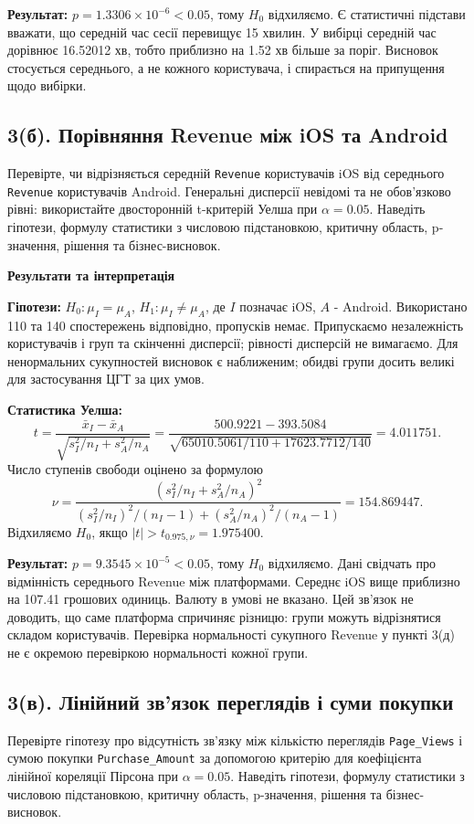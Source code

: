 \documentclass[11pt,a4paper]{article}
\newcommand{\pythoncode}[1]{%
  \Needspace{6\baselineskip}
  \begin{tcolorbox}[enhanced,breakable,colback=black!2!white,colframe=black!15!white,
    colbacktitle=black!6!white,coltitle=accent,fonttitle=\bfseries\small,
    title=Код Python,title after break={Код Python (продовження)},boxrule=0.4pt,arc=1mm,left=2mm,right=2mm,top=2mm,bottom=2mm,
    before skip=6pt,after skip=8pt]
  
  \end{tcolorbox}}
\newcommand{\answerheading}{\Needspace{4\baselineskip}\par\medskip
  {\color{answergreen}\bfseries Результати та інтерпретація}\par\smallskip}
\begin{document}
\textbf{Результат:} \(p=1.3306\times 10^{-6}<0.05\), тому \(H_0\) відхиляємо. Є статистичні підстави вважати, що середній час сесії перевищує 15 хвилин. У вибірці середній час дорівнює 16.52012 хв, тобто приблизно на 1.52 хв більше за поріг. Висновок стосується середнього, а не кожного користувача, і спирається на припущення щодо вибірки.
\subsection*{3(б). Порівняння Revenue між iOS та Android}
\begin{taskstatement}
Перевірте, чи відрізняється середній \texttt{Revenue} користувачів iOS від середнього \texttt{Revenue} користувачів Android.
Генеральні дисперсії невідомі та не обов’язково рівні: використайте двосторонній t-критерій Уелша при $\alpha=0.05$.
Наведіть гіпотези, формулу статистики з числовою підстановкою, критичну область, p-значення, рішення та бізнес-висновок.
\end{taskstatement}


\pythoncode{part3-cell7}
\answerheading
\textbf{Гіпотези:} \(H_0:\mu_I=\mu_A\), \(H_1:\mu_I\ne\mu_A\), де \(I\) позначає iOS, \(A\) - Android. Використано 110 та 140 спостережень відповідно, пропусків немає. Припускаємо незалежність користувачів і груп та скінченні дисперсії; рівності дисперсій не вимагаємо. Для ненормальних сукупностей висновок є наближеним; обидві групи досить великі для застосування ЦГТ за цих умов.

\textbf{Статистика Уелша:} \[t=\frac{\bar x_I-\bar x_A}{\sqrt{s_I^2/n_I+s_A^2/n_A}}
=\frac{500.9221-393.5084}{\sqrt{65010.5061/110+17623.7712/140}}=4.011751.\] Число ступенів свободи оцінено за формулою \[\nu=\frac{(s_I^2/n_I+s_A^2/n_A)^2}{(s_I^2/n_I)^2/(n_I-1)+(s_A^2/n_A)^2/(n_A-1)}=154.869447.\] Відхиляємо \(H_0\), якщо \(|t|>t_{0.975,\nu}=1.975400\).

\textbf{Результат:} \(p=9.3545\times 10^{-5}<0.05\), тому \(H_0\) відхиляємо. Дані свідчать про відмінність середнього Revenue між платформами. Середнє iOS вище приблизно на 107.41 грошових одиниць. Валюту в умові не вказано. Цей зв'язок не доводить, що саме платформа спричиняє різницю: групи можуть відрізнятися складом користувачів. Перевірка нормальності сукупного Revenue у пункті 3(д) не є окремою перевіркою нормальності кожної групи.
\subsection*{3(в). Лінійний зв’язок переглядів і суми покупки}
\begin{taskstatement}
Перевірте гіпотезу про відсутність зв’язку між кількістю переглядів \texttt{Page\_Views} і сумою покупки \texttt{Purchase\_Amount}
за допомогою критерію для коефіцієнта лінійної кореляції Пірсона при $\alpha=0.05$.
Наведіть гіпотези, формулу статистики з числовою підстановкою, критичну область, p-значення, рішення та бізнес-висновок.
\end{taskstatement}
\end{document}
